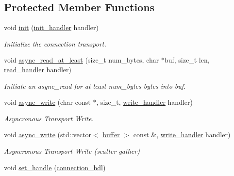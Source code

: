 \subsection*{Protected Member Functions}
\begin{DoxyCompactItemize}
\item 
void \hyperlink{classwebsocketpp_1_1transport_1_1debug_1_1connection_a1ed8a6a163997f22ab3977c58514d607}{init} (\hyperlink{namespacewebsocketpp_1_1transport_aeae75e675c1a334b3b33ab7120b480a5}{init\+\_\+handler} handler)
\begin{DoxyCompactList}\small\item\em Initialize the connection transport. \end{DoxyCompactList}\item 
void \hyperlink{classwebsocketpp_1_1transport_1_1debug_1_1connection_a9dd1522c7700b42b9d54b32d394e32fe}{async\+\_\+read\+\_\+at\+\_\+least} (size\+\_\+t num\+\_\+bytes, char $\ast$buf, size\+\_\+t len, \hyperlink{namespacewebsocketpp_1_1transport_a3a9b2ed54dfcc6ebe7d7e6b4c02f53fb}{read\+\_\+handler} handler)
\begin{DoxyCompactList}\small\item\em Initiate an async\+\_\+read for at least num\+\_\+bytes bytes into buf. \end{DoxyCompactList}\item 
void \hyperlink{classwebsocketpp_1_1transport_1_1debug_1_1connection_aecc282f30447d46911cd54f676fe0a73}{async\+\_\+write} (char const $\ast$, size\+\_\+t, \hyperlink{namespacewebsocketpp_1_1transport_addf5d728159e7aa2bce2a0df947b1560}{write\+\_\+handler} handler)
\begin{DoxyCompactList}\small\item\em Asyncronous Transport Write. \end{DoxyCompactList}\item 
void \hyperlink{classwebsocketpp_1_1transport_1_1debug_1_1connection_af8a648a7501f13845fe6708fab59ac1f}{async\+\_\+write} (std\+::vector$<$ \hyperlink{structwebsocketpp_1_1transport_1_1buffer}{buffer} $>$ const \&, \hyperlink{namespacewebsocketpp_1_1transport_addf5d728159e7aa2bce2a0df947b1560}{write\+\_\+handler} handler)
\begin{DoxyCompactList}\small\item\em Asyncronous Transport Write (scatter-\/gather) \end{DoxyCompactList}\item 
void \hyperlink{classwebsocketpp_1_1transport_1_1debug_1_1connection_affdbe8c6860526e66b651ddd402f9cf3}{set\+\_\+handle} (\hyperlink{namespacewebsocketpp_a6b3d26a10ee7229b84b776786332631d}{connection\+\_\+hdl})

\end{DoxyCompactItemize}
